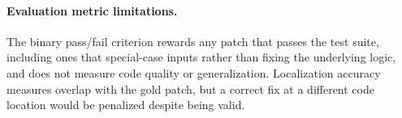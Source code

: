 \paragraph{Evaluation metric limitations.}
The binary pass/fail criterion rewards any patch that passes the test suite, including ones that special-case inputs rather than fixing the underlying logic, and does not measure code quality or generalization.
Localization accuracy measures overlap with the gold patch, but a correct fix at a different code location would be penalized despite being valid.

